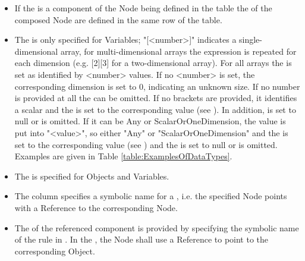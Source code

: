 \begin{itemize}
    \item If the  is a component of the Node being defined in the table the  of the composed Node are defined in the same row of the table. 
    \item The  is only specified for Variables; "[<number>]" indicates a single-dimensional array, for multi-dimensional arrays the expression is repeated for each dimension (e.g. [2][3] for a two-dimensional array). For all arrays the  is set as identified by <number> values. If no <number> is set, the corresponding dimension is set to 0, indicating an unknown size. If no number is provided at all the  can be omitted. If no brackets are provided, it identifies a scalar  and the  is set to the corresponding value (see \cite{UAPart3}). In addition,  is set to null or is omitted. If it can be Any or ScalarOrOneDimension, the value is put into "{<value>}", so either "{Any}" or "{ScalarOrOneDimension}" and the  is set to the corresponding value (see \cite{UAPart3}) and the  is set to null or is omitted. Examples are given in Table \ref{table:ExamplesOfDataTypes}.
    \item The  is specified for Objects and Variables.
    \item The  column specifies a symbolic name for a , i.e. the specified Node points with a  Reference to the corresponding Node.
    \item The  of the referenced component is provided by specifying the symbolic name of the rule in . In the , the Node shall use a  Reference to point to the corresponding  Object.
\end{itemize}

